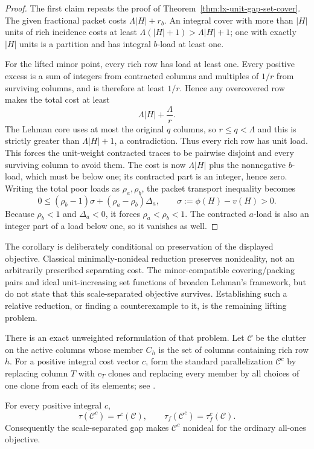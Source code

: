 \begin{proof}
The first claim repeats the proof of Theorem~\ref{thm:lx-unit-gap-set-cover}.
The given fractional packet costs $\Lambda|H|+r_b$.  An integral cover with
more than $|H|$ units of rich incidence costs at least
$\Lambda(|H|+1)>\Lambda|H|+1$; one with exactly $|H|$ units is a partition
and has integral $b$-load at least one.

For the lifted minor point, every rich row has load at least one.  Every
positive excess is a sum of integers from contracted columns and multiples
of $1/r$ from surviving columns, and is therefore at least $1/r$.  Hence
any overcovered row makes the total cost at least
\[
 \Lambda|H|+\frac{\Lambda}{r}.
\]
The Lehman core uses at most the original $q$ columns, so
$r\leq q<\Lambda$ and this is strictly greater than
$\Lambda|H|+1$, a contradiction.  Thus every rich row has unit load.  This
forces the unit-weight contracted traces to be pairwise disjoint and every
surviving column to avoid them.  The cost is now $\Lambda|H|$ plus the
nonnegative $b$-load, which must be below one; its contracted part is an
integer, hence zero.  Writing the total poor loads as $\rho_a,\rho_b$, the
packet transport inequality becomes
\[
 0\leq(\rho_b-1)\sigma+(\rho_a-\rho_b)\Delta_a,
 \qquad \sigma:=\phi(H)-v(H)>0.
\]
Because $\rho_b<1$ and $\Delta_a<0$, it forces
$\rho_a<\rho_b<1$.  The contracted $a$-load is also an integer part of a
load below one, so it vanishes as well.
\end{proof}

The corollary is deliberately conditional on preservation of the displayed
objective.  Classical minimally-nonideal reduction preserves nonideality,
not an arbitrarily prescribed separating cost.  The minor-compatible
covering/packing pairs and ideal unit-increasing set functions of
\citet{KiralyPap2016} broaden Lehman's framework, but do not state that this
scale-separated objective survives.  Establishing such a relative reduction,
or finding a counterexample to it, is the remaining lifting problem.

There is an exact unweighted reformulation of that problem.  Let
$\mathcal C$ be the clutter on the active columns whose member $C_h$ is the
set of columns containing rich row $h$.  For a positive integral cost vector
$c$, form the standard parallelization $\mathcal C^c$ by replacing column
$T$ with $c_T$ clones and replacing every member by all choices of one clone
from each of its elements; see \citet{Cornuejols2001}.

\begin{proposition}
\label{prop:lx-parallelized-relative-minor}
For every positive integral $c$,
\[
 \tau(\mathcal C^c)=\tau^c(\mathcal C),
 \qquad
 \tau_f(\mathcal C^c)=\tau_f^c(\mathcal C).       \tag{PAR}
 \label{eq:lx-parallelized-gap}
\]
Consequently the scale-separated gap makes $\mathcal C^c$ nonideal for the
ordinary all-ones objective.
\end{proposition}

